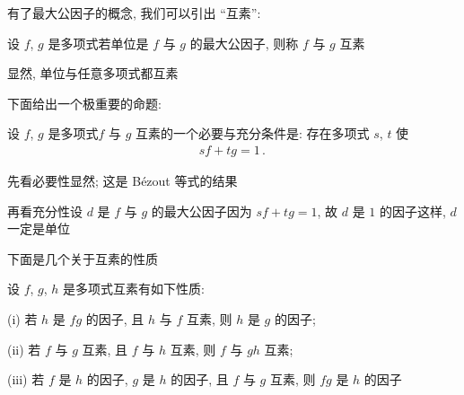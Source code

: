 有了最大公因子的概念, 我们可以引出 ``互素'':
\begin{definition}
    设 $f$, $g$ 是多项式\period 若单位是 $f$ 与 $g$ 的最大公因子, 则称 $f$ 与 $g$ 互素 \period
\end{definition}

\begin{example}
    显然, 单位与任意多项式都互素\period
\end{example}

下面给出一个极重要的命题:
\begin{proposition}
    设 $f$, $g$ 是多项式\period $f$ 与 $g$ 互素的一个必要与充分条件是: 存在多项式 $s$, $t$ 使
    \begin{align*}
        sf + tg = 1 \period
    \end{align*}
\end{proposition}

\begin{pf}
    先看必要性\period 显然; 这是 Bézout 等式的结果\period

    再看充分性\period 设 $d$ 是 $f$ 与 $g$ 的最大公因子\period 因为 $sf + tg = 1$, 故 $d$ 是 $1$ 的因子\period 这样, $d$ 一定是单位\period
\end{pf}

下面是几个关于互素的性质\period

\begin{proposition}
    设 $f$, $g$, $h$ 是多项式\period 互素有如下性质:

    (i) 若 $h$ 是 $fg$ 的因子, 且 $h$ 与 $f$ 互素, 则 $h$ 是 $g$ 的因子;

    (ii) 若 $f$ 与 $g$ 互素, 且 $f$ 与 $h$ 互素, 则 $f$ 与 $gh$ 互素;

    (iii) 若 $f$ 是 $h$ 的因子, $g$ 是 $h$ 的因子, 且 $f$ 与 $g$ 互素, 则 $fg$ 是 $h$ 的因子\period
\end{proposition}

